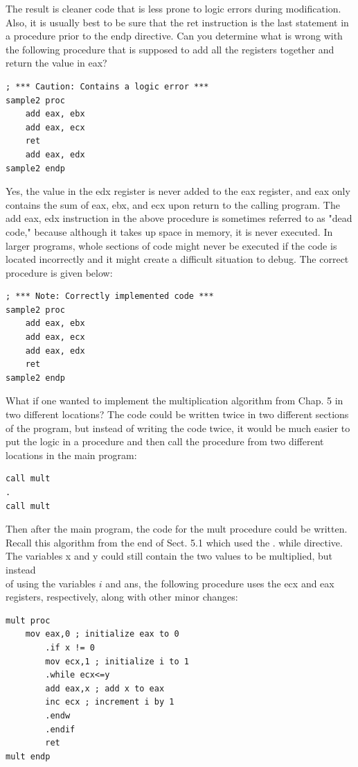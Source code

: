 \documentclass[10pt]{article}
\begin{document}
The result is cleaner code that is less prone to logic errors during modification. Also, it is usually best to be sure that the ret instruction is the last statement in a procedure prior to the endp directive. Can you determine what is wrong with the following procedure that is supposed to add all the registers together and return the value in eax?

\begin{verbatim}
; *** Caution: Contains a logic error ***
sample2 proc
    add eax, ebx
    add eax, ecx
    ret
    add eax, edx
sample2 endp
\end{verbatim}

Yes, the value in the edx register is never added to the eax register, and eax only contains the sum of eax, ebx, and ecx upon return to the calling program. The add eax, edx instruction in the above procedure is sometimes referred to as "dead code," because although it takes up space in memory, it is never executed. In larger programs, whole sections of code might never be executed if the code is located incorrectly and it might create a difficult situation to debug. The correct procedure is given below:

\begin{verbatim}
; *** Note: Correctly implemented code ***
sample2 proc
    add eax, ebx
    add eax, ecx
    add eax, edx
    ret
sample2 endp
\end{verbatim}

What if one wanted to implement the multiplication algorithm from Chap. 5 in two different locations? The code could be written twice in two different sections of the program, but instead of writing the code twice, it would be much easier to put the logic in a procedure and then call the procedure from two different locations in the main program:

\begin{verbatim}
call mult
.
call mult
\end{verbatim}

Then after the main program, the code for the mult procedure could be written. Recall this algorithm from the end of Sect. 5.1 which used the . while directive. The variables x and y could still contain the two values to be multiplied, but instead\\
of using the variables $i$ and ans, the following procedure uses the ecx and eax registers, respectively, along with other minor changes:

\begin{verbatim}
mult proc
    mov eax,0 ; initialize eax to 0
        .if x != 0
        mov ecx,1 ; initialize i to 1
        .while ecx<=y
        add eax,x ; add x to eax
        inc ecx ; increment i by 1
        .endw
        .endif
        ret
mult endp
\end{verbatim}
\end{document}
